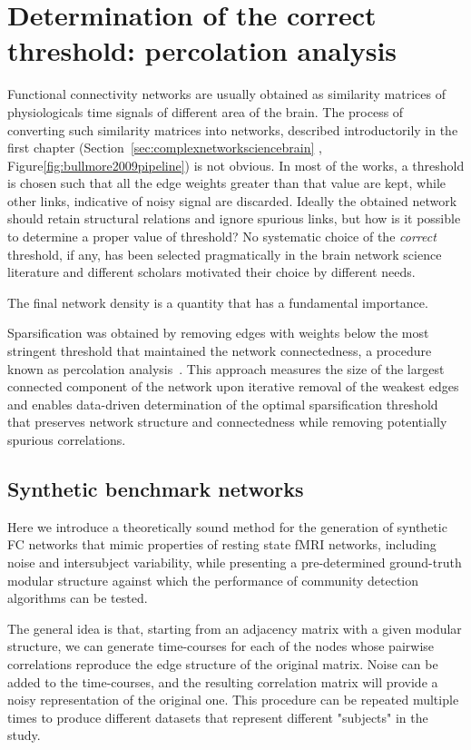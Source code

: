 \section{Determination of the correct threshold: percolation analysis}
Functional connectivity networks are usually obtained as similarity matrices of physiologicals time signals of different area of the brain. The process of converting such similarity matrices into networks, described introductorily in the first chapter (Section~\ref{sec:complexnetworksciencebrain} , Figure\ref{fig:bullmore2009pipeline}) is not obvious. In most of the works, a threshold is chosen such that all the edge weights greater than that value are kept, while other links, indicative of noisy signal are discarded. Ideally the obtained network should retain structural relations and ignore spurious links, but how is it possible to determine a proper value of threshold? No systematic choice of the \emph{correct} threshold, if any, has been selected pragmatically in the brain network science literature and different scholars motivated their choice by different needs.

The final network density is a quantity that has a fundamental importance.


{\color{red}
Sparsification was obtained by removing edges with weights below the most stringent threshold that maintained the network connectedness, a procedure known as  percolation analysis~\cite{gallos2012,bardella2016a,alexander-bloch2010}. This approach measures the size of the largest connected component of the network upon iterative removal of the weakest edges and enables data-driven determination of the optimal sparsification threshold that preserves network structure and connectedness while removing potentially spurious correlations.
}



\subsection{Synthetic benchmark networks}
Here we introduce a theoretically sound method for the generation of synthetic FC networks that mimic properties of resting state fMRI networks, including noise and intersubject variability, while presenting a pre-determined ground-truth modular structure against which the performance of community detection algorithms can be tested.

The general idea is that, starting from an adjacency matrix with a given modular structure, we can generate time-courses for each of the nodes whose pairwise correlations reproduce the edge structure of the original matrix. Noise can be added to the time-courses, and the resulting correlation matrix will provide a noisy representation of the original one. This procedure can be repeated multiple times to produce different datasets that represent different "subjects" in the study.


